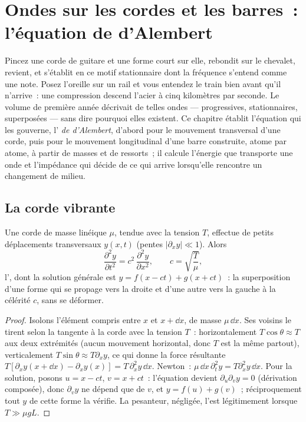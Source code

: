 \chapter{Ondes sur les cordes et les barres~: l'équation de d'Alembert}\label{ch:b2:waves-on-strings}

Pincez une corde de guitare et une forme court sur elle, rebondit sur le
chevalet, revient, et s'établit en ce motif stationnaire dont la
fréquence s'entend comme une note. Posez l'oreille sur un rail et vous
entendez le train bien avant qu'il n'arrive~: une compression descend
l'acier à cinq kilomètres par seconde. Le volume de première année décrivait de telles
ondes --- progressives, stationnaires, superposées --- sans dire pourquoi elles
existent. Ce chapitre établit l'équation qui les gouverne,
l'\emph{ de d'Alembert}, d'abord pour le mouvement transversal d'une
corde, puis pour le mouvement longitudinal d'une barre construite, atome par atome,
à partir de masses et de ressorts~; il calcule l'énergie que transporte une onde et
l'impédance qui décide de ce qui arrive lorsqu'elle rencontre un changement de milieu.

\section{La corde vibrante}

\begin{theorem}\label{thm:b2:waves-on-strings:equation}
Une corde de masse linéique $\mu$, tendue avec la tension $T$, effectue de
petits déplacements transversaux $y(x, t)$ (pentes $|\partial_xy| \ll 1$). Alors
\[
\frac{\partial^2y}{\partial t^2} = c^2\,\frac{\partial^2y}{\partial x^2} ,
\qquad c = \sqrt{\frac{T}{\mu}} ,
\]
l'\emph{}, dont la solution générale est $y = f(x - ct)
+ g(x + ct)$~: la superposition d'une forme qui se propage vers la droite et
d'une autre vers la gauche à la célérité $c$, sans se déformer.
\end{theorem}

\begin{proof}
Isolons l'élément compris entre $x$ et $x + \dd x$, de masse $\mu\,\dd x$. Ses
voisins le tirent selon la tangente à la corde avec la tension $T$~:
horizontalement $T\cos\theta \approx T$ aux deux extrémités (aucun mouvement horizontal, donc
$T$ est la même partout), verticalement $T\sin\theta \approx T\partial_xy$, ce qui
donne la force résultante $T[\partial_xy(x + \dd x) - \partial_xy(x)] = T\,\partial_x^2y\,\dd x$.
Newton~: $\mu\,\dd x\,\partial_t^2y = T\partial_x^2y\,\dd x$. Pour la solution, posons
$u = x - ct$, $v = x + ct$~: l'équation devient $\partial_u\partial_vy = 0$
(dérivation composée), donc $\partial_vy$ ne dépend que de $v$, et $y = f(u) + g(v)$~;
réciproquement tout $y$ de cette forme la vérifie. La pesanteur, négligée, l'est
légitimement lorsque $T \gg \mu gL$.
\end{proof}

